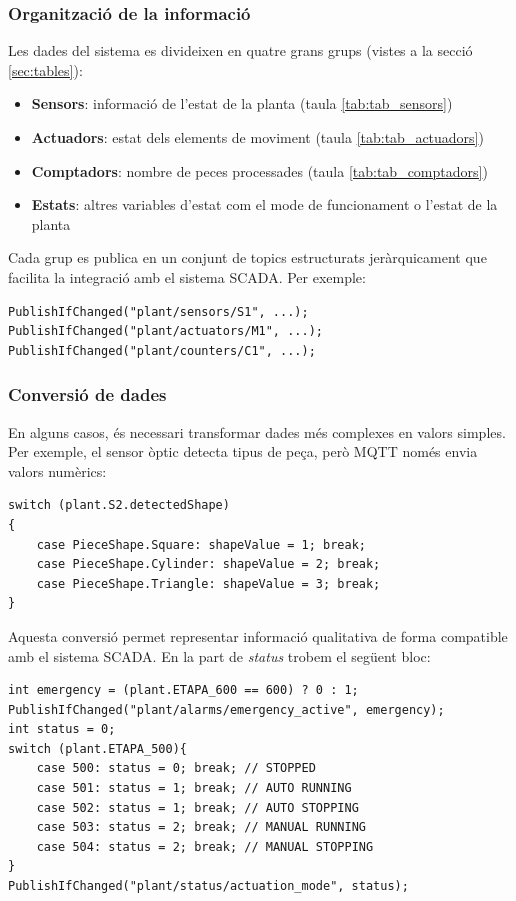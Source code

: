 \documentclass[a4paper,11pt,DIV=13,headings=normal,abstract=true,twoside=semi]{article}
\begin{document}
\subsubsection*{Organització de la informació}

Les dades del sistema es divideixen en quatre grans grups (vistes a la secció \ref{sec:tables}):

\begin{itemize}
    \item \textbf{Sensors}: informació de l'estat de la planta (taula \ref{tab:tab_sensors})
    \item \textbf{Actuadors}: estat dels elements de moviment (taula \ref{tab:tab_actuadors})
    \item \textbf{Comptadors}: nombre de peces processades (taula \ref{tab:tab_comptadors})
    \item \textbf{Estats}: altres variables d'estat com el mode de funcionament o l'estat de la planta
\end{itemize}

Cada grup es publica en un conjunt de topics estructurats jeràrquicament que facilita la integració amb el sistema SCADA. Per exemple:

\begin{lstlisting}[style=simple]
PublishIfChanged("plant/sensors/S1", ...);
PublishIfChanged("plant/actuators/M1", ...);
PublishIfChanged("plant/counters/C1", ...);
\end{lstlisting}


\subsubsection{Conversió de dades}

En alguns casos, és necessari transformar dades més complexes en valors simples. Per exemple, el sensor òptic detecta tipus de peça, però MQTT només envia valors numèrics:

\begin{lstlisting}[style=simple]
switch (plant.S2.detectedShape)
{
    case PieceShape.Square: shapeValue = 1; break;
    case PieceShape.Cylinder: shapeValue = 2; break;
    case PieceShape.Triangle: shapeValue = 3; break;
}
\end{lstlisting}

Aquesta conversió permet representar informació qualitativa de forma compatible amb el sistema SCADA. En la part de \textit{status} trobem el següent bloc:
\begin{lstlisting}[style=simple]
int emergency = (plant.ETAPA_600 == 600) ? 0 : 1;
PublishIfChanged("plant/alarms/emergency_active", emergency);
int status = 0;
switch (plant.ETAPA_500){
    case 500: status = 0; break; // STOPPED
    case 501: status = 1; break; // AUTO RUNNING
    case 502: status = 1; break; // AUTO STOPPING
    case 503: status = 2; break; // MANUAL RUNNING
    case 504: status = 2; break; // MANUAL STOPPING
}
PublishIfChanged("plant/status/actuation_mode", status);
\end{lstlisting}
 
\end{document}
